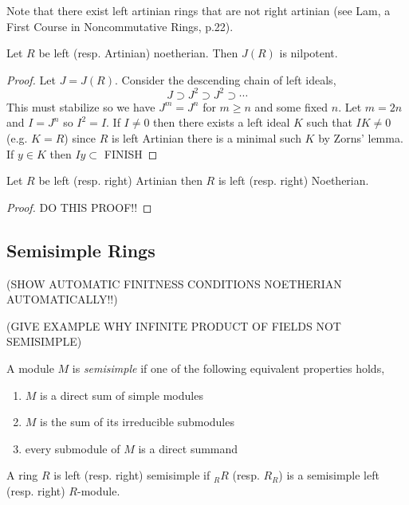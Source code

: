 \documentclass[12pt]{article}
\begin{document}
\begin{rmk}
Note that there exist left artinian rings that are not right artinian (see Lam, a First Course in Noncommutative Rings, p.22). 
\end{rmk}

\begin{prop}
Let $R$ be left (resp. Artinian) noetherian. Then $J(R)$ is nilpotent.
\end{prop}

\begin{proof}
Let $J = J(R)$.
Consider the descending chain of left ideals,
\[ J \supset J^2 \supset J^2 \supset \cdots \]
This must stabilize so we have $J^m = J^{n}$ for $m \ge n$ and some fixed $n$. Let $m = 2n$ and $I = J^n$ so $I^2 = I$. If $I \neq 0$ then there exists a left ideal $K$ such that $I K \neq 0$ (e.g. $K = R$) since $R$ is left Artinian there is a minimal such $K$ by Zorns' lemma. If $y \in K$ then $Iy \subset $ FINISH
\end{proof}

\begin{prop}
Let $R$ be left (resp. right) Artinian then $R$ is left (resp. right) Noetherian.
\end{prop}

\begin{proof}
DO THIS PROOF!!
\end{proof}

\subsection{Semisimple Rings}

(SHOW AUTOMATIC FINITNESS CONDITIONS NOETHERIAN AUTOMATICALLY!!)

(GIVE EXAMPLE WHY INFINITE PRODUCT OF FIELDS NOT SEMISIMPLE)

\begin{defn}
A module $M$ is \textit{semisimple} if one of the following equivalent properties holds,
\begin{enumerate}
\item $M$ is a direct sum of simple modules
\item $M$ is the sum of its irreducible submodules
\item every submodule of $M$ is a direct summand
\end{enumerate}
\end{defn}

\begin{defn}
A ring $R$ is left (resp. right) semisimple if ${}_R R$ (resp. $R_{R}$) is a semisimple left (resp. right) $R$-module.
\end{defn}
\end{document}
